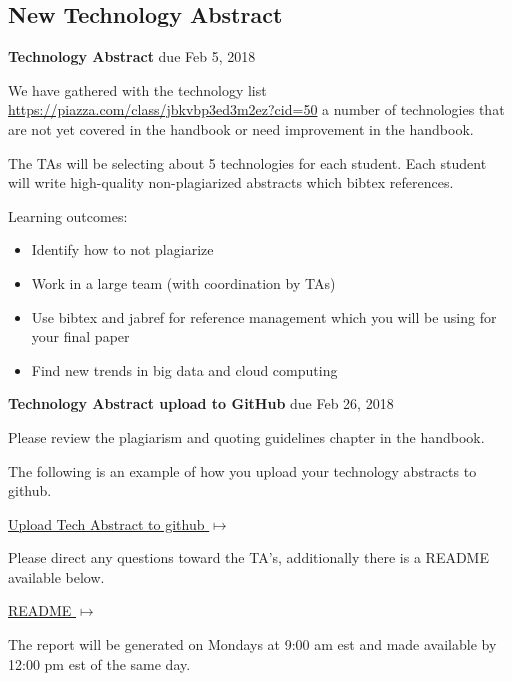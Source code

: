 \subsection{New Technology Abstract}
\label{E:616-new-tech-abstract}

\begin{exercise} {\bf Technology Abstract} due Feb 5, 2018

We have gathered with the technology list
\url{https://piazza.com/class/jbkvbp3ed3m2ez?cid=50} a number of
technologies that are not yet covered in the handbook or
need improvement in the handbook.


The TAs will be selecting about 5 technologies for each student. Each
student will write high-quality non-plagiarized abstracts which bibtex
references.
 
Learning outcomes:

\begin{itemize}

\item Identify how to not plagiarize
\item Work in a large team (with coordination by TAs)
\item Use bibtex and jabref for reference management which you will be using for your final paper
\item Find new trends in big data and cloud computing

\end{itemize}

\end{exercise}

\begin{exercise}{\bf Technology Abstract upload to GitHub} due Feb 26,
  2018


Please review the plagiarism and quoting guidelines chapter in the
handbook.


The following is an example of how you upload your technology
abstracts to github.
\smallskip

{\hfill \href{https://github.com/cloudmesh-community/hid-sample/tree/master/technology}{Upload
    Tech Abstract to github $\mapsto$}}

\smallskip

Please direct any questions toward the TA's, additionally there is a
README available below. 

{\hfill
  \href{https://github.com/cloudmesh-community/hid-sample/blob/master/technology/README.md}{README
    $\mapsto$}}

\smallskip

The report will be generated on Mondays at 9:00 am est and made
available by 12:00 pm est of the same day.
\smallskip


\end{exercise}

